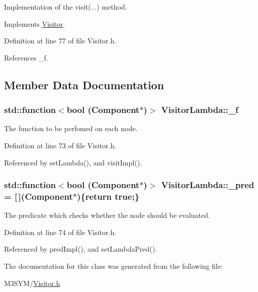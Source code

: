 Implementation of the visit(...) method. 



Implements \hyperlink{classVisitor_a1ebdba266c77626f67a22fc2300d8dc3}{Visitor}.



Definition at line 77 of file Visitor.\+h.



References \+\_\+f.



\subsection{Member Data Documentation}
\hypertarget{classVisitorLambda_a098597c2b62c63a2fd2a833add3cc43d}{
\subsubsection[{\+\_\+f}]{\setlength{\rightskip}{0pt plus 5cm}std\+::function$<$bool ({\bf Component}$\ast$)$>$ Visitor\+Lambda\+::\+\_\+f\hspace{0.3cm}{\ttfamily [protected]}}}\label{classVisitorLambda_a098597c2b62c63a2fd2a833add3cc43d}


The function to be perfomed on each node. 



Definition at line 73 of file Visitor.\+h.



Referenced by set\+Lambda(), and visit\+Impl().

\hypertarget{classVisitorLambda_adfd5fc76108d52d9abc981c020379661}{
\subsubsection[{\+\_\+pred}]{\setlength{\rightskip}{0pt plus 5cm}std\+::function$<$bool ({\bf Component}$\ast$)$>$ Visitor\+Lambda\+::\+\_\+pred = \mbox{[}$\,$\mbox{]}({\bf Component}$\ast$)\{return true;\}\hspace{0.3cm}{\ttfamily [protected]}}}\label{classVisitorLambda_adfd5fc76108d52d9abc981c020379661}


The predicate which checks whether the node should be evaluated. 



Definition at line 74 of file Visitor.\+h.



Referenced by pred\+Impl(), and set\+Lambda\+Pred().



The documentation for this class was generated from the following file\+:\begin{DoxyCompactItemize}
\item 
M3\+S\+Y\+M/\hyperlink{Visitor_8h}{Visitor.\+h}\end{DoxyCompactItemize}
